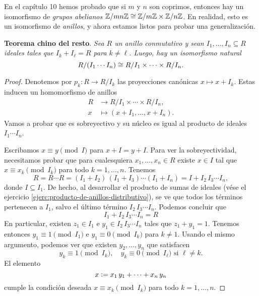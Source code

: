 En el capítulo 10 hemos probado que si $m$ y $n$ son coprimos, entonces hay
un isomorfismo de \emph{grupos abelianos}
$\mathbb{Z}/mn\mathbb{Z} \cong \mathbb{Z}/m\mathbb{Z}\times \mathbb{Z}/n\mathbb{Z}$. En realidad, esto es un isomorfismo
de \emph{anillos}, y ahora estamos listos para probar una generalización.

\begin{nameless}\textbf{Teorema chino del resto}.
  \emph{Sea $R$ un anillo conmutativo y sean $I_1, \ldots, I_n \subseteq R$
    ideales tales que $I_k + I_\ell = R$ para $k \ne \ell$. Luego, hay
    un isomorfismo natural}
  $$R/(I_1\cdots I_n) \cong R/I_1 \times \cdots \times R/I_n.$$

\begin{proof}
  Denotemos por $p_k\colon R\to R/I_k$ las proyecciones canónicas
  $x \mapsto x + I_k$. Estas inducen un homomorfismo de anillos
  \begin{align*}
    R & \to R/I_1 \times \cdots \times R/I_n,\\
    x & \mapsto (x+I_1,\ldots,x+I_n).
  \end{align*}
  Vamos a probar que es sobreyectivo y su núcleo es igual al producto de ideales
  $I_1\cdots I_n$.

  Escribamos $x \equiv y \pmod{I}$ para $x + I = y + I$. Para ver
  la sobreyectividad, necesitamos probar que para cualesquiera
  $x_1,\ldots,x_n\in R$ existe $x\in I$ tal que $x \equiv x_k \pmod{I_k}$ para
  todo $k = 1, \ldots, n$. Tenemos
  \[ R = R\cdots R = (I_1 + I_2)\,(I_1 + I_3)\cdots (I_1 + I_n) =
     I + I_2\,I_3\cdots I_n, \]
   donde $I \subseteq I_1$. De hecho, al desarrollar el producto de sumas
   de ideales (vése el ejercicio \ref{ejerc:producto-de-anillos-distributivo}),
   se ve que todos los términos pertenecen a $I_1$, salvo el último término
   $I_2\,I_3\cdots I_n$. Podemos concluir que
   \begin{equation}
     \label{eqn:I1-I2I3In-coprimos}
     I_1 + I_2\,I_3\cdots I_n = R
   \end{equation}
   En particular, existen $z_1 \in I_1$ e $y_1 \in I_2\,I_3\cdots I_n$ tales
   que $z_1 + y_1 = 1$. Tenemos entonces $y_1 \equiv 1 \pmod{I_1}$ e
   $y_1 \equiv 0 \pmod{I_k}$ para $k \ne 1$. Usando el mismo argumento, podemos
   ver que existen $y_2, \ldots, y_n$ que satisfacen
   \[ y_k \equiv 1 \pmod{I_k}, \quad y_k \equiv 0 \pmod{I_\ell}
      \text{ si }\ell \ne k. \]
   El elemento
   $$x \mathrel{\mathop:}= x_1\,y_1 + \cdots + x_n\,y_n$$
   cumple la condición deseada $x \equiv x_k \pmod{I_k}$ para todo
   $k = 1, \ldots, n$.


\end{proof}
\end{nameless}

